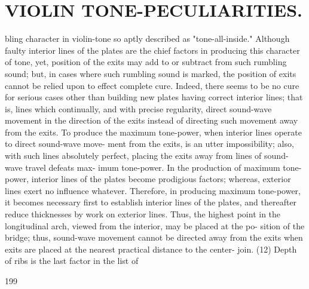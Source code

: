 \documentclass{article}
\begin{document}
\section*{VIOLIN TONE-PECULIARITIES.}
bling character in violin-tone so aptly described as "tone-all-inside." Although faulty interior lines of the plates are the chief factors in producing this character of tone, yet, position of the exits may add to or subtract from such rumbling sound; but, in cases where such rumbling sound is marked, the position of exits cannot be relied upon to effect complete cure. Indeed, there seems to be no cure for serious cases other than building new plates having correct interior lines; that is, lines which continually, and with precise regularity, direct sound-wave movement in the direction of the exits instead of directing such movement away from the exits. To produce the maximum tone-power, when interior lines operate to direct sound-wave move- ment from the exits, is an utter impossibility; also, with such lines absolutely perfect, placing the exits away from lines of sound-wave travel defeats max- imum tone-power. In the production of maximum tone-power, interior lines of the plates become prodigious factors; whereas, exterior lines exert no influence whatever. Therefore, in producing maximum tone-power, it becomes necessary first to establish interior lines of the plates, and thereafter reduce thicknesses by work on exterior lines. Thus, the highest point in the longitudinal arch, viewed from the interior, may be placed at the po- sition of the bridge; thus, sound-wave movement cannot be directed away from the exits when exits are placed at the nearest practical distance to the center- join. (12) Depth of ribs is the last factor in the list of

199
\end{document}
